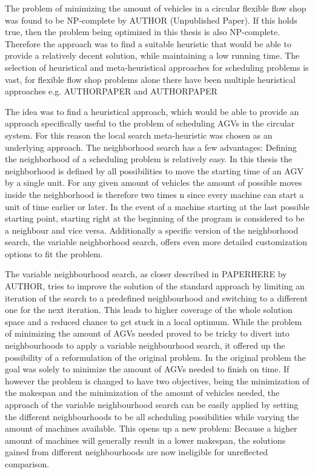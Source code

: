 The problem of minimizing the amount of vehicles in a circular flexible flow shop was found to be NP-complete by AUTHOR (Unpublished Paper). If this
holds true, then the problem being optimized in this thesis is also NP-complete. Therefore the approach was to find a suitable heuristic that would be able to provide a relatively decent
solution, while maintaining a low running time. The selection of heuristical and meta-heuristical approaches for scheduling problems is vast, for
flexible flow shop problems alone there have been multiple heuristical approaches e.g. AUTHORPAPER and AUTHORPAPER

The idea was to find a heuristical approach, which would be able to provide an approach specifically useful to the problem of scheduling AGVs in the circular system. For this reason
the local search meta-heuristic was chosen as an underlying approach. The neighborhood search has a few advantages: Defining the neighborhood of
a scheduling problem is relatively easy. In this thesis the neighborhood is defined by all possibilities to move the starting time of an AGV by
a single unit. For any given amount of vehicles the amount of possible moves inside the neighborhood is therefore two times n since every machine
can start a unit of time earlier or later. In the event of a machine starting at the last possible starting point, starting right at the beginning
of the program is considered to be a neighbour and vice versa. Additionally a specific version of the neighborhood search, the variable neighborhood search,
offers even more detailed customization options to fit the problem.

The variable neighbourhood search, as closer described in PAPERHERE by AUTHOR, tries to improve the solution of the standard approach by limiting
an iteration of the search to a predefined neighbourhood and switching to a different one for the next iteration. This leads to higher coverage of
the whole solution space and a reduced chance to get stuck in a local optimum. While the problem of minimizing the amount of AGVs needed proved
to be tricky to divert into neighbourhoods to apply a variable neighbourhood search, it offered up the possibility of a reformulation of the original
problem. In the original problem the goal was solely to minimize the amount of AGVs needed to finish on time. If however the problem is changed to
have two objectives, being the minimization of the makespan and the minimization of the amount of vehicles needed, the approach of the variable
neighbourhood search can be easily applied by setting the different neighbourhoods to be all scheduling possibilities while varying the amount of
machines available. This opens up a new problem: Because a higher amount of machines will generally result in a lower makespan, the solutions gained
from different neighbourhoods are now ineligible for unreflected comparison.

